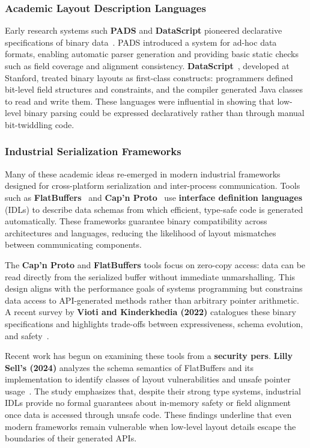 \subsubsection{Academic Layout Description Languages}
Early research systems such \textbf{PADS} and \textbf{DataScript} pioneered
declarative specifications of binary
data~\autocite{fisher2005pads,back2002datascript}. PADS introduced a system for
ad-hoc data formats, enabling automatic parser generation and providing
basic static checks such as field coverage
and alignment consistency. 
\textbf{DataScript}~\autocite{back2002datascript}, developed at Stanford,
treated binary layouts as first-class constructs: programmers defined bit-level
field structures and constraints, and the compiler generated Java classes to
read and write them. These languages were influential in showing that low-level
binary parsing could be expressed declaratively rather than through manual
bit-twiddling code. 

\subsubsection{Industrial Serialization Frameworks}
Many of these academic ideas re-emerged in modern industrial
frameworks designed for cross-platform serialization and
inter-process communication. Tools such as
\textbf{FlatBuffers}~\autocite{flat_buffers} and 
\textbf{Cap'n Proto}~\autocite{capn_proto_serialization}
use \textbf{interface definition languages} (IDLs) to describe data
schemas from which efficient, type-safe code is generated automatically.
These frameworks guarantee binary compatibility across architectures
and languages, reducing the likelihood of layout mismatches between
communicating components.

The \textbf{Cap'n Proto} and \textbf{FlatBuffers} tools focus on
zero-copy access: data can be read directly from the
serialized buffer without immediate unmarshalling. This design
aligns with the performance goals of systems programming but
constrains data access to API-generated methods
rather than arbitrary pointer arithmetic. A recent survey by
\textbf{Vioti and Kinderkhedia (2022)}  catalogues these binary specifications
and highlights trade-offs between expressiveness, schema evolution, and
safety~\autocite{viotti2022survey}. 

Recent work has begun on examining these tools from a \textbf{security
pers}. \textbf{Lilly Sell's (2024)} analyzes the schema semantics of
FlatBuffers and its implementation to identify classes of layout
vulnerabilities and unsafe pointer usage~\autocite{sellsecurity}. The
study emphasizes that, despite their strong type systems, industrial
IDLs provide no formal guarantees about in-memory safety or field alignment
once data is accessed through unsafe code. These findings
underline that even modern frameworks remain
vulnerable when low-level layout details escape the boundaries of their
generated APIs.


